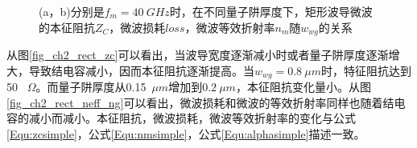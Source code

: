 \begin{figure}[htb]
	\small
\caption{(a，b)分别是$f_m = 40~GHz$时，在不同量子阱厚度下，矩形波导微波的本征阻抗$Z_C$，微波损耗$loss$，微波等效折射率$n_m$随$w_{wg}$的关系}
\label{fig_ch2_rect_microwave_property}	
\end{figure}

从图\ref{fig_ch2_rect_zc}可以看出，当波导宽度逐渐减小时或者量子阱厚度逐渐增大，导致结电容减小，因而本征阻抗逐渐提高。当$w_{wg} = 0.8~ \mu m$时，特征阻抗达到50~ $\Omega$。而量子阱厚度从0.15~$\mu m$增加到$0.2~\mu m$，本征阻抗变化量小。从图\ref{fig_ch2_rect_neff_ng}可以看出，微波损耗和微波的等效折射率同样也随着结电容的减小而减小。本征阻抗，微波损耗，微波等效折射率的变化与公式\ref{Equ:zcsimple}，公式\ref{Equ:nmsimple}，公式\ref{Equ:alphasimple}描述一致。

